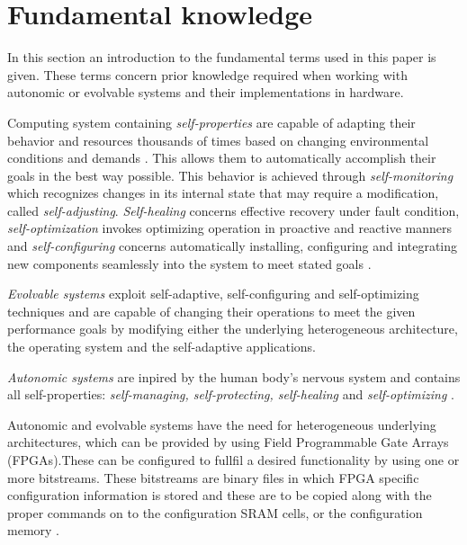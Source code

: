\section{Fundamental knowledge}
\label{sec:fundamental}
In this section an introduction to the fundamental terms used in this paper is given. These terms concern prior knowledge required when working with autonomic or evolvable systems and their implementations in hardware. 

Computing system containing \emph{self-properties} are capable of adapting their behavior and resources thousands of times based on changing environmental conditions and demands \cite{selfaware}. This allows them to automatically accomplish their goals in the best way possible. This behavior is achieved through \emph{self-monitoring} which recognizes changes in its internal state that may require a modification, called \emph{self-adjusting}. \emph{Self-healing} concerns effective recovery under fault condition, \emph{self-optimization} invokes optimizing operation in proactive and reactive manners and \emph{self-configuring} concerns automatically installing, configuring and integrating new components seamlessly into the system to meet stated goals \cite{autonomic}. 

\emph{Evolvable systems} exploit self-adaptive, self-configuring and self-optimizing techniques and are capable of changing their operations to meet the given performance goals by modifying either the underlying heterogeneous architecture, the operating system and the self-adaptive applications. \cite{evolvable}

\emph{Autonomic systems} are inpired by the human body's nervous system and contains all self-properties: \emph{self-managing, self-protecting, self-healing} and \emph{self-optimizing} \cite{autonomic}. 

Autonomic and evolvable systems have the need for heterogeneous underlying architectures, which can be provided by using Field Programmable Gate Arrays (FPGAs).These can be configured to fullfil a desired functionality by using one or more bitstreams. These bitstreams are binary files in which FPGA specific configuration information is stored and these are to be copied along with the proper commands on to the configuration SRAM cells, or the configuration memory \cite{reconfigurable}. 